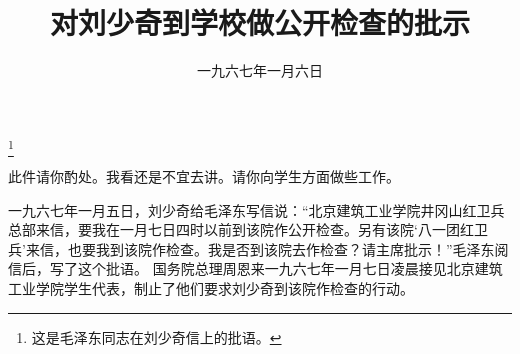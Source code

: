 
\title{对刘少奇到学校做公开检查的批示}
\date{一九六七年一月六日}
\thanks{这是毛泽东同志在刘少奇信上的批语。}
\maketitle



此件请你酌处。我看还是不宜去讲。请你向学生方面做些工作。


\begin{maonote}
一九六七年一月五日，刘少奇给毛泽东写信说：“北京建筑工业学院井冈山红卫兵总部来信，要我在一月七日四时以前到该院作公开检查。另有该院‘八一团红卫兵’来信，也要我到该院作检查。我是否到该院去作检查？请主席批示！”毛泽东阅信后，写了这个批语。
国务院总理周恩来一九六七年一月七日凌晨接见北京建筑工业学院学生代表，制止了他们要求刘少奇到该院作检查的行动。
\end{maonote}
